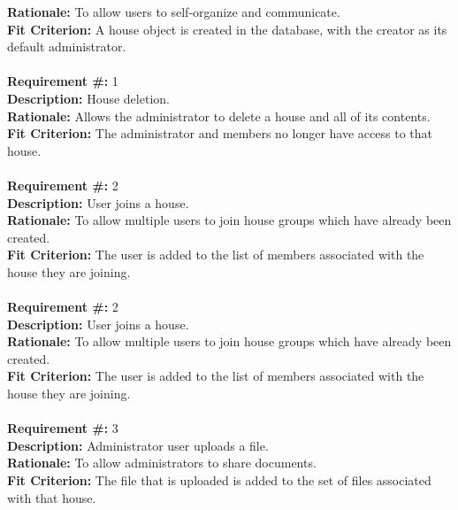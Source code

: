 \documentclass[12pt]{article}
\begin{document}
      \textbf{Rationale:} To allow users to self-organize and communicate. \\
      \textbf{Fit Criterion:} A house object is created in the database, with
      the creator as its default administrator. \\ \\  
\textbf{Requirement \#:} 1 
       \\
      \textbf{Description:} House deletion. \\
      \textbf{Rationale:} Allows the administrator to delete a house and all of its contents. \\
      \textbf{Fit Criterion:} The administrator and members no longer have access to that house. \\ \\  
\textbf{Requirement \#:} 2 
       \\
      \textbf{Description:} User joins a house. \\
      \textbf{Rationale:} To allow multiple users to join house groups which
      have already been created. \\
      \textbf{Fit Criterion:} The user is added to the list of members
      associated with the house they are joining. \\ \\
\textbf{Requirement \#:} 2 
       \\
      \textbf{Description:} User joins a house. \\
      \textbf{Rationale:} To allow multiple users to join house groups which
      have already been created. \\
      \textbf{Fit Criterion:} The user is added to the list of members
      associated with the house they are joining. \\ \\
\textbf{Requirement \#:} 3 
       \\
      \textbf{Description:} Administrator user uploads a file. \\
      \textbf{Rationale:} To allow administrators to share documents. \\
      \textbf{Fit Criterion:} The file that is uploaded is added to the set of
      files associated with that house. \\ \\
\end{document}
